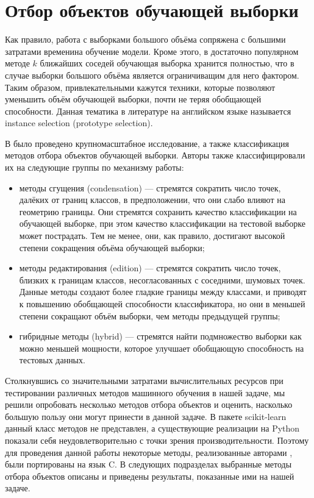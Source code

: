 \section{Отбор объектов обучающей выборки}
Как правило, работа с выборками большого объёма сопряжена с большими затратами временина обучение модели. Кроме этого, в достаточно популярном методе \(k\) ближайших соседей обучающая выборка хранится полностью, что в случае выборки большого объёма является ограничиващим для него фактором. Таким образом, привлекательными кажутся техники, которые позволяют уменьшить объём обучающей выборки, почти не теряя обобщающей способности. Данная тематика в литературе на английском языке называется instance selection (prototype selection).

В \cite{ps-taxonomy} было проведено крупномасштабное исследование, а также классификация методов отбора объектов обучающей выборки. Авторы также классифицировали их на следующие группы по механизму работы:
\begin{itemize}
    \item методы сгущения (condensation) --- стремятся сократить число точек, далёких от границ классов, в предположении, что они слабо влияют на геометрию границы. Они стремятся сохранить качество классификации на обучающей выборке, при этом качество классификации на тестовой выборке может пострадать. Тем не менее, они, как правило, достигают высокой степени сокращения объёма обучающей выборки;
    \item методы редактирования (edition) --- стремятся сократить число точек, близких к границам классов, несогласованных с соседними, шумовых точек. Данные методы создают более гладкие границы между классами, и приводят к повышению обобщающей способности классификатора, но они в меньшей степени сокращают объём выборки, чем методы предыдущей группы;
    \item гибридные методы (hybrid) --- стремятся найти подмножество выборки как можно меньшей мощности, которое улучшает обобщающую способность на тестовых данных.
\end{itemize}

Столкнувшись со значительными затратами вычислительных ресурсов при тестировании различных методов машинного обучения в нашей задаче, мы решили опробовать несколько методов отбора объектов и оценить, насколько большую пользу они могут принести в данной задаче. В пакете scikit-learn данный класс методов не представлен, а существующие реализации на Python \cite{scikit-protopy} показали себя неудовлетворительно с точки зрения производительности. Поэтому для проведения данной работы некоторые методы, реализованные авторами \cite{ps-taxonomy}, были портированы на язык C. В следующих подразделах выбранные методы отбора объектов описаны и приведены результаты, показанные ими на нашей задаче.

